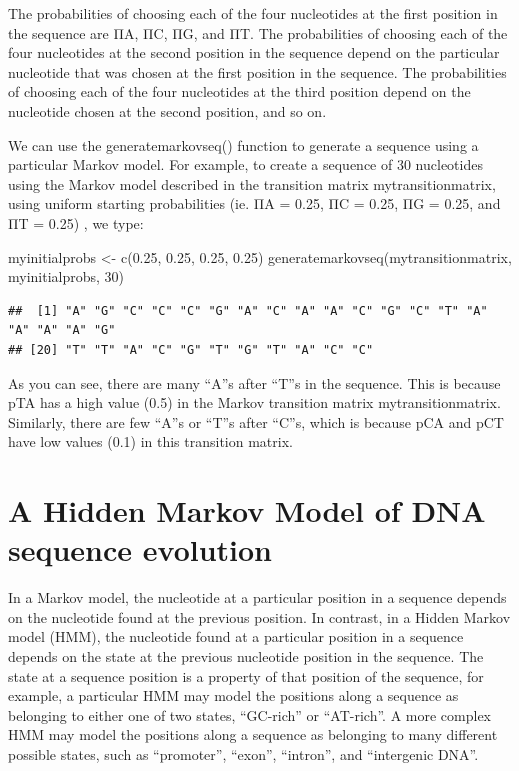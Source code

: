 \documentclass[
]{book}
\newenvironment{Shaded}{\begin{snugshade}}{\end{snugshade}}
\newcommand{\DecValTok}[1]{\textcolor[rgb]{0.00,0.00,0.81}{#1}}
\newcommand{\FloatTok}[1]{\textcolor[rgb]{0.00,0.00,0.81}{#1}}
\newcommand{\FunctionTok}[1]{\textcolor[rgb]{0.00,0.00,0.00}{#1}}
\newcommand{\NormalTok}[1]{#1}
\newcommand{\OtherTok}[1]{\textcolor[rgb]{0.56,0.35,0.01}{#1}}
\begin{document}
The probabilities of choosing each of the four nucleotides at the first position in the sequence are ΠA, ΠC, ΠG, and ΠT. The probabilities of choosing each of the four nucleotides at the second position in the sequence depend on the particular nucleotide that was chosen at the first position in the sequence. The probabilities of choosing each of the four nucleotides at the third position depend on the nucleotide chosen at the second position, and so on.

We can use the generatemarkovseq() function to generate a sequence using a particular Markov model. For example, to create a sequence of 30 nucleotides using the Markov model described in the transition matrix mytransitionmatrix, using uniform starting probabilities (ie. ΠA = 0.25, ΠC = 0.25, ΠG = 0.25, and ΠT = 0.25) , we type:

\begin{Shaded}
\begin{Highlighting}[]
\NormalTok{myinitialprobs }\OtherTok{\textless{}{-}} \FunctionTok{c}\NormalTok{(}\FloatTok{0.25}\NormalTok{, }\FloatTok{0.25}\NormalTok{, }\FloatTok{0.25}\NormalTok{, }\FloatTok{0.25}\NormalTok{)}
\FunctionTok{generatemarkovseq}\NormalTok{(mytransitionmatrix, myinitialprobs, }\DecValTok{30}\NormalTok{)}
\end{Highlighting}
\end{Shaded}

\begin{verbatim}
##  [1] "A" "G" "C" "C" "C" "G" "A" "C" "A" "A" "C" "G" "C" "T" "A" "A" "A" "A" "G"
## [20] "T" "T" "A" "C" "G" "T" "G" "T" "A" "C" "C"
\end{verbatim}

As you can see, there are many ``A''s after ``T''s in the sequence. This is because pTA has a high value (0.5) in the Markov transition matrix mytransitionmatrix. Similarly, there are few ``A''s or ``T''s after ``C''s, which is because pCA and pCT have low values (0.1) in this transition matrix.

\hypertarget{a-hidden-markov-model-of-dna-sequence-evolution}{%
\section{A Hidden Markov Model of DNA sequence evolution}\label{a-hidden-markov-model-of-dna-sequence-evolution}}

In a Markov model, the nucleotide at a particular position in a sequence depends on the nucleotide found at the previous position. In contrast, in a Hidden Markov model (HMM), the nucleotide found at a particular position in a sequence depends on the state at the previous nucleotide position in the sequence. The state at a sequence position is a property of that position of the sequence, for example, a particular HMM may model the positions along a sequence as belonging to either one of two states, ``GC-rich'' or ``AT-rich''. A more complex HMM may model the positions along a sequence as belonging to many different possible states, such as ``promoter'', ``exon'', ``intron'', and ``intergenic DNA''.
\end{document}
